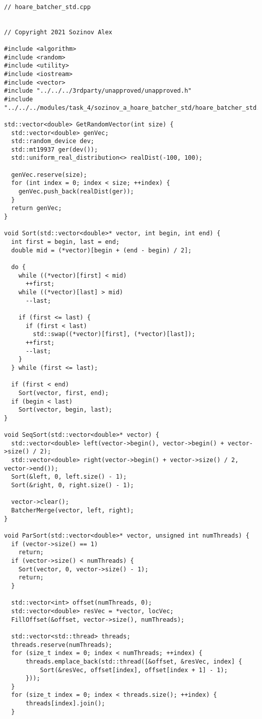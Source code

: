 \documentclass{report}
\begin{document}
\begin{lstlisting}

// hoare_batcher_std.cpp


// Copyright 2021 Sozinov Alex

#include <algorithm>
#include <random>
#include <utility>
#include <iostream>
#include <vector>
#include "../../../3rdparty/unapproved/unapproved.h"
#include "../../../modules/task_4/sozinov_a_hoare_batcher_std/hoare_batcher_std.h"

std::vector<double> GetRandomVector(int size) {
  std::vector<double> genVec;
  std::random_device dev;
  std::mt19937 ger(dev());
  std::uniform_real_distribution<> realDist(-100, 100);

  genVec.reserve(size);
  for (int index = 0; index < size; ++index) {
    genVec.push_back(realDist(ger));
  }
  return genVec;
}

void Sort(std::vector<double>* vector, int begin, int end) {
  int first = begin, last = end;
  double mid = (*vector)[begin + (end - begin) / 2];

  do {
    while ((*vector)[first] < mid)
      ++first;
    while ((*vector)[last] > mid)
      --last;

    if (first <= last) {
      if (first < last)
        std::swap((*vector)[first], (*vector)[last]);
      ++first;
      --last;
    }
  } while (first <= last);

  if (first < end)
    Sort(vector, first, end);
  if (begin < last)
    Sort(vector, begin, last);
}

void SeqSort(std::vector<double>* vector) {
  std::vector<double> left(vector->begin(), vector->begin() + vector->size() / 2);
  std::vector<double> right(vector->begin() + vector->size() / 2, vector->end());
  Sort(&left, 0, left.size() - 1);
  Sort(&right, 0, right.size() - 1);

  vector->clear();
  BatcherMerge(vector, left, right);
}

void ParSort(std::vector<double>* vector, unsigned int numThreads) {
  if (vector->size() == 1)
    return;
  if (vector->size() < numThreads) {
    Sort(vector, 0, vector->size() - 1);
    return;
  }

  std::vector<int> offset(numThreads, 0);
  std::vector<double> resVec = *vector, locVec;
  FillOffset(&offset, vector->size(), numThreads);

  std::vector<std::thread> threads;
  threads.reserve(numThreads);
  for (size_t index = 0; index < numThreads; ++index) {
      threads.emplace_back(std::thread([&offset, &resVec, index] {
          Sort(&resVec, offset[index], offset[index + 1] - 1);
      }));
  }
  for (size_t index = 0; index < threads.size(); ++index) {
      threads[index].join();
  }


\end{lstlisting}
\end{document}
